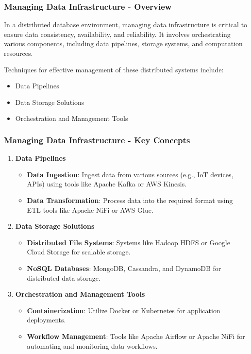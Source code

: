 \documentclass[aspectratio=169]{beamer}
\begin{document}
\begin{frame}[fragile]
    \frametitle{Managing Data Infrastructure - Overview}
    In a distributed database environment, managing data infrastructure is critical to ensure data consistency, availability, and reliability. It involves orchestrating various components, including data pipelines, storage systems, and computation resources.

    Techniques for effective management of these distributed systems include:
    \begin{itemize}
        \item Data Pipelines
        \item Data Storage Solutions
        \item Orchestration and Management Tools
    \end{itemize}
\end{frame}

\begin{frame}[fragile]
    \frametitle{Managing Data Infrastructure - Key Concepts}
    \begin{enumerate}
        \item \textbf{Data Pipelines}
            \begin{itemize}
                \item \textbf{Data Ingestion}: Ingest data from various sources (e.g., IoT devices, APIs) using tools like Apache Kafka or AWS Kinesis.
                \item \textbf{Data Transformation}: Process data into the required format using ETL tools like Apache NiFi or AWS Glue.
            \end{itemize}

        \item \textbf{Data Storage Solutions}
            \begin{itemize}
                \item \textbf{Distributed File Systems}: Systems like Hadoop HDFS or Google Cloud Storage for scalable storage.
                \item \textbf{NoSQL Databases}: MongoDB, Cassandra, and DynamoDB for distributed data storage.
            \end{itemize}

        \item \textbf{Orchestration and Management Tools}
            \begin{itemize}
                \item \textbf{Containerization}: Utilize Docker or Kubernetes for application deployments.
                \item \textbf{Workflow Management}: Tools like Apache Airflow or Apache NiFi for automating and monitoring data workflows.
            \end{itemize}
    \end{enumerate}
\end{frame}
\end{document}
